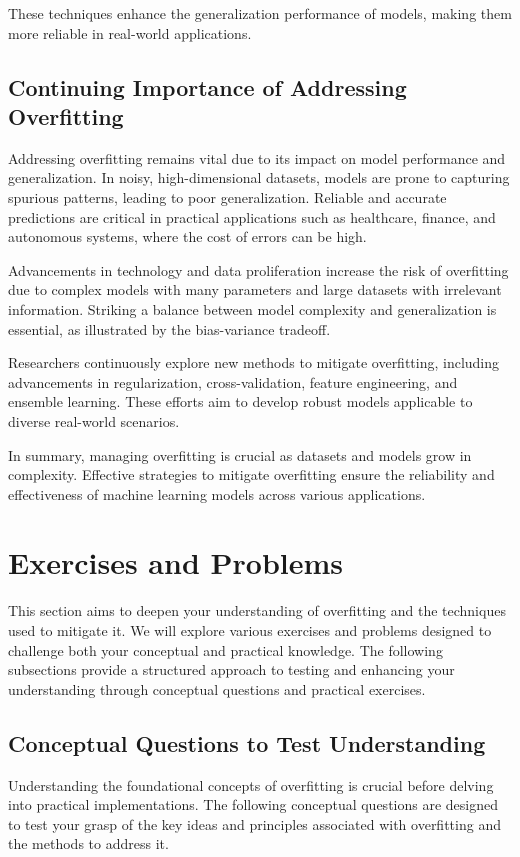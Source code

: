 \documentclass[12pt]{book} %
\begin{document}
These techniques enhance the generalization performance of models, making them more reliable in real-world applications.

\subsection{Continuing Importance of Addressing Overfitting}

Addressing overfitting remains vital due to its impact on model performance and generalization. In noisy, high-dimensional datasets, models are prone to capturing spurious patterns, leading to poor generalization. Reliable and accurate predictions are critical in practical applications such as healthcare, finance, and autonomous systems, where the cost of errors can be high.

Advancements in technology and data proliferation increase the risk of overfitting due to complex models with many parameters and large datasets with irrelevant information. Striking a balance between model complexity and generalization is essential, as illustrated by the bias-variance tradeoff.

Researchers continuously explore new methods to mitigate overfitting, including advancements in regularization, cross-validation, feature engineering, and ensemble learning. These efforts aim to develop robust models applicable to diverse real-world scenarios.

In summary, managing overfitting is crucial as datasets and models grow in complexity. Effective strategies to mitigate overfitting ensure the reliability and effectiveness of machine learning models across various applications.

\section{Exercises and Problems}
This section aims to deepen your understanding of overfitting and the techniques used to mitigate it. We will explore various exercises and problems designed to challenge both your conceptual and practical knowledge. The following subsections provide a structured approach to testing and enhancing your understanding through conceptual questions and practical exercises.

\subsection{Conceptual Questions to Test Understanding}
Understanding the foundational concepts of overfitting is crucial before delving into practical implementations. The following conceptual questions are designed to test your grasp of the key ideas and principles associated with overfitting and the methods to address it.
\end{document}
